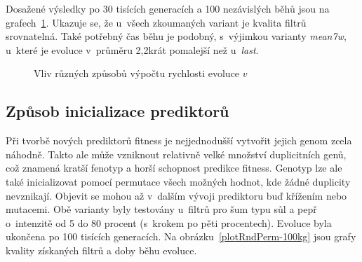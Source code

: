 Dosažené výsledky po 30 tisících generacích a 100 nezávislých běhů jsou na grafech~\ref{plotBwalg-30kg}. Ukazuje se, že u~všech zkoumaných variant je kvalita filtrů srovnatelná. Také potřebný čas běhu je podobný, s~výjimkou varianty \emph{mean7w}, u~které je evoluce v~průměru 2,2krát pomalejší než u~\emph{last}.

\begin{figure}[htb]
    \centering
    \captionsetup{aboveskip=0pt}
    \caption{Vliv různých způsobů výpočtu rychlosti evoluce $v$}
    \label{plotBwalg-30kg}
\end{figure}

\subsection{Způsob inicializace prediktorů}

Při tvorbě nových prediktorů fitness je nejjednodušší vytvořit jejich genom zcela náhodně. Takto ale může vzniknout relativně velké množství duplicitních genů, což znamená kratší fenotyp a horší schopnost predikce fitness. Genotyp lze ale také inicializovat pomocí permutace všech možných hodnot, kde žádné duplicity nevznikají. Objevit se mohou až v~dalším vývoji prediktoru buď křížením nebo mutacemi. Obě varianty byly testovány u~filtrů pro šum typu sůl a pepř o~intenzitě od 5 do 80 procent (s~krokem po pěti procentech). Evoluce byla ukončena po 100 tisících generacích. Na obrázku~\ref{plotRndPerm-100kg} jsou grafy kvality získaných filtrů a doby běhu evoluce.

